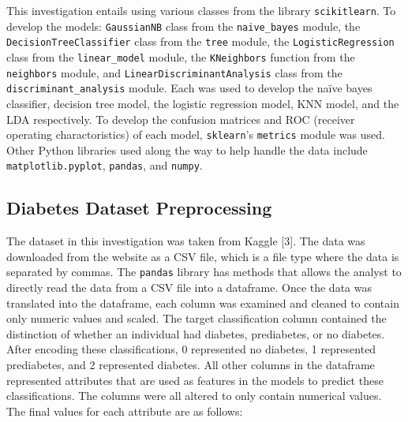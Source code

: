 \documentclass[journal]{IEEEtran}
\begin{document}
This investigation entails using various classes from the library \lstinline{scikitlearn}. To develop the models: \lstinline{GaussianNB} class from the \lstinline{naive_bayes} module, the \lstinline{DecisionTreeClassifier} class from the \lstinline{tree} module, the \lstinline{LogisticRegression} class from the \lstinline{linear_model} module, the \lstinline{KNeighbors} function from the \lstinline{neighbors} module, and \lstinline{LinearDiscriminantAnalysis} class from the \lstinline{discriminant_analysis} module. Each was used to develop the naïve bayes classifier, decision tree model, the logistic regression model, KNN model, and the LDA respectively. To develop the confusion matrices and ROC (receiver operating charactoristics) of each model,  \lstinline{sklearn}'s \lstinline{metrics} module was used. Other Python libraries used along the way to help handle the data include \lstinline{matplotlib.pyplot}, \lstinline{pandas}, and \lstinline{numpy}. 

\subsection{Diabetes Dataset Preprocessing}

The dataset in this investigation was taken from Kaggle [3]. The data was downloaded from the website as a CSV file, which is a file type where the data is separated by commas. The \lstinline{pandas} library has methods that allows the analyst to directly read the data from a CSV file into a dataframe. Once the data was translated into the dataframe, each column was examined and cleaned to contain only numeric values and scaled. The target classification column contained the distinction of whether an individual had diabetes, prediabetes, or no diabetes. After encoding these classifications, 0 represented no diabetes, 1 represented prediabetes, and 2 represented diabetes. All other columns in the dataframe represented attributes that are used as features in the models to predict these classifications. The columns were all altered to only contain numerical values. The final values for each attribute are as follows: 
\end{document}
